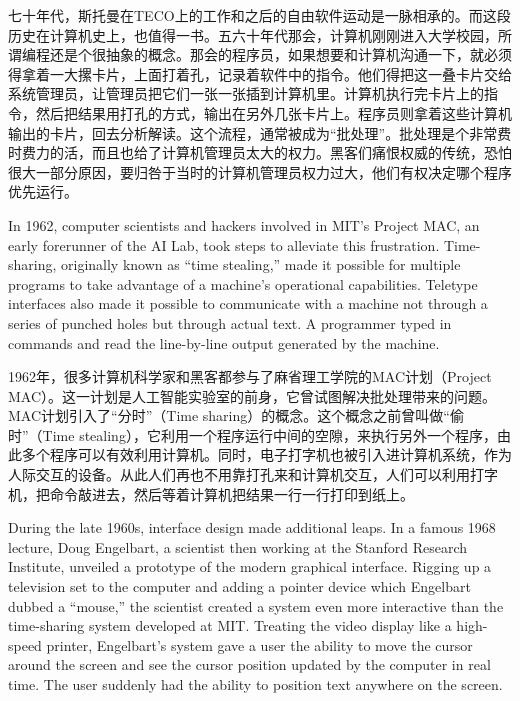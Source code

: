 \ifdefined\chs
七十年代，斯托曼在TECO上的工作和之后的自由软件运动是一脉相承的。而这段历史在计算机史上，也值得一书。五六十年代那会，计算机刚刚进入大学校园，所谓编程还是个很抽象的概念。那会的程序员，如果想要和计算机沟通一下，就必须得拿着一大摞卡片，上面打着孔，记录着软件中的指令。他们得把这一叠卡片交给系统管理员，让管理员把它们一张一张插到计算机里。计算机执行完卡片上的指令，然后把结果用打孔的方式，输出在另外几张卡片上。程序员则拿着这些计算机输出的卡片，回去分析解读。这个流程，通常被成为``批处理''。批处理是个非常费时费力的活，而且也给了计算机管理员太大的权力。黑客们痛恨权威的传统，恐怕很大一部分原因，要归咎于当时的计算机管理员权力过大，他们有权决定哪个程序优先运行。
\fi

\ifdefined\eng
In 1962, computer scientists and hackers involved in MIT's Project MAC, an early forerunner of the AI Lab, took steps to alleviate this frustration. Time-sharing, originally known as ``time stealing,'' made it possible for multiple programs to take advantage of a machine's operational capabilities. Teletype interfaces also made it possible to communicate with a machine not through a series of punched holes but through actual text. A programmer typed in commands and read the line-by-line output generated by the machine.
\fi

\ifdefined\chs
1962年，很多计算机科学家和黑客都参与了麻省理工学院的MAC计划（Project MAC）。这一计划是人工智能实验室的前身，它曾试图解决批处理带来的问题。MAC计划引入了``分时''（Time sharing）的概念。这个概念之前曾叫做``偷时''（Time stealing），它利用一个程序运行中间的空隙，来执行另外一个程序，由此多个程序可以有效利用计算机。同时，电子打字机也被引入进计算机系统，作为人际交互的设备。从此人们再也不用靠打孔来和计算机交互，人们可以利用打字机，把命令敲进去，然后等着计算机把结果一行一行打印到纸上。
\fi

\ifdefined\eng
During the late 1960s, interface design made additional leaps. In a famous 1968 lecture, Doug Engelbart, a scientist then working at the Stanford Research Institute, unveiled a prototype of the modern graphical interface. Rigging up a television set to the computer and adding a pointer device which Engelbart dubbed a ``mouse,'' the scientist created a system even more interactive than the time-sharing system developed at MIT. Treating the video display like a high-speed printer, Engelbart's system gave a user the ability to move the cursor around the screen and see the cursor position updated by the computer in real time. The user suddenly had the ability to position text anywhere on the screen.
\fi

